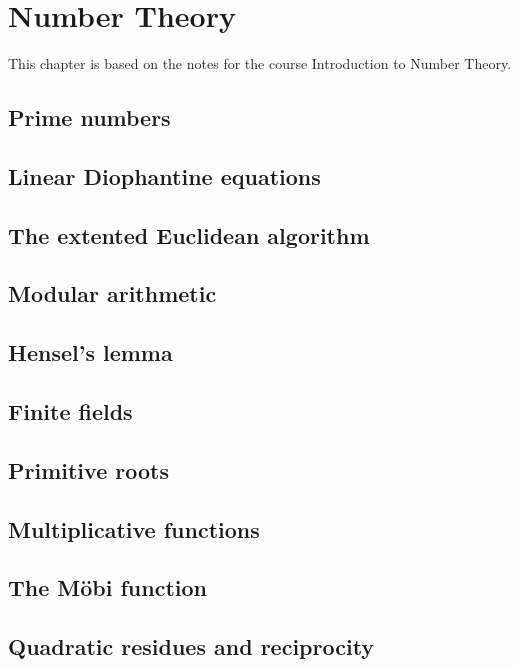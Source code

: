 \chapter{Number Theory}\label{cha:intr-numb-theory}
This chapter is based on the notes for the course Introduction to Number Theory.

\section{Prime numbers}

\section{Linear Diophantine equations}

\section{The extented Euclidean algorithm}

\section{Modular arithmetic}

\section{Hensel's lemma}

\section{Finite fields}

\section{Primitive roots}

\section{Multiplicative functions}

\section{The M\"obi function}

\section{Quadratic residues and reciprocity}

